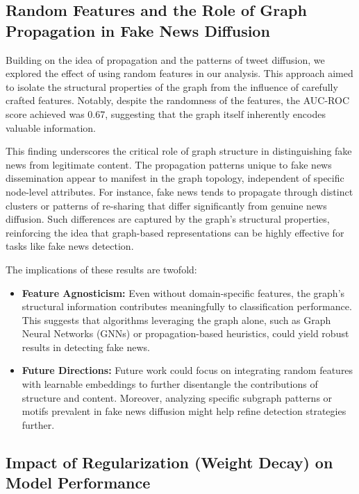 \documentclass[sigconf,nonacm]{acmart}
\begin{document}
\subsection{Random Features and the Role of Graph Propagation in Fake News Diffusion}

Building on the idea of propagation and the patterns of tweet diffusion, we explored the effect of using random features in our analysis. This approach aimed to isolate the structural properties of the graph from the influence of carefully crafted features. Notably, despite the randomness of the features, the AUC-ROC score achieved was 0.67, suggesting that the graph itself inherently encodes valuable information.

This finding underscores the critical role of graph structure in distinguishing fake news from legitimate content. The propagation patterns unique to fake news dissemination appear to manifest in the graph topology, independent of specific node-level attributes. For instance, fake news tends to propagate through distinct clusters or patterns of re-sharing that differ significantly from genuine news diffusion. Such differences are captured by the graph's structural properties, reinforcing the idea that graph-based representations can be highly effective for tasks like fake news detection.

The implications of these results are twofold:
\begin{itemize}
    \item \textbf{Feature Agnosticism:} Even without domain-specific features, the graph's structural information contributes meaningfully to classification performance. This suggests that algorithms leveraging the graph alone, such as Graph Neural Networks (GNNs) or propagation-based heuristics, could yield robust results in detecting fake news.
    \item \textbf{Future Directions:} Future work could focus on integrating random features with learnable embeddings to further disentangle the contributions of structure and content. Moreover, analyzing specific subgraph patterns or motifs prevalent in fake news diffusion might help refine detection strategies further.
\end{itemize}

\subsection{Impact of Regularization (Weight Decay) on Model Performance}
\end{document}
